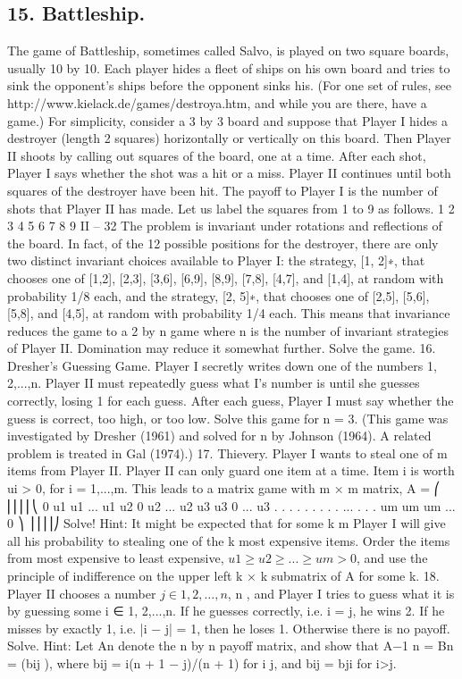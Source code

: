 \subsection{15. Battleship.}
The game of Battleship, sometimes called Salvo, is played on two
square boards, usually 10 by 10. Each player hides a fleet of ships on his own board and
tries to sink the opponent’s ships before the opponent sinks his. (For one set of rules, see
http://www.kielack.de/games/destroya.htm, and while you are there, have a game.)
For simplicity, consider a 3 by 3 board and suppose that Player I hides a destroyer
(length 2 squares) horizontally or vertically on this board. Then Player II shoots by calling
out squares of the board, one at a time. After each shot, Player I says whether the shot
was a hit or a miss. Player II continues until both squares of the destroyer have been hit.
The payoff to Player I is the number of shots that Player II has made. Let us label the
squares from 1 to 9 as follows.
1 2 3
4 5 6
7 8 9
II – 32
The problem is invariant under rotations and reflections of the board. In fact, of
the 12 possible positions for the destroyer, there are only two distinct invariant choices
available to Player I: the strategy, [1, 2]∗, that chooses one of [1,2], [2,3], [3,6], [6,9], [8,9],
[7,8], [4,7], and [1,4], at random with probability 1/8 each, and the strategy, [2, 5]∗, that
chooses one of [2,5], [5,6], [5,8], and [4,5], at random with probability 1/4 each. This means
that invariance reduces the game to a 2 by n game where n is the number of invariant
strategies of Player II. Domination may reduce it somewhat further. Solve the game.
16. Dresher’s Guessing Game. Player I secretly writes down one of the numbers
1, 2,...,n. Player II must repeatedly guess what I’s number is until she guesses correctly,
losing 1 for each guess. After each guess, Player I must say whether the guess is correct,
too high, or too low. Solve this game for n = 3. (This game was investigated by Dresher
(1961) and solved for n  by Johnson (1964). A related problem is treated in Gal
(1974).)
17. Thievery. Player I wants to steal one of m  items from Player II. Player II
can only guard one item at a time. Item i is worth ui > 0, for i = 1,...,m. This leads to
a matrix game with m × m matrix,
A =
⎛
⎜⎜⎜⎜⎝
0 u1 u1 ... u1
u2 0 u2 ... u2
u3 u3 0 ... u3
.
.
. .
.
. .
.
. ... .
.
.
um um um ... 0
⎞
⎟⎟⎟⎟⎠
Solve!
Hint: It might be expected that for some k \leq m Player I will give all his probability
to stealing one of the k most expensive items. Order the items from most expensive to
least expensive, $u1 \geq u2 \geq ... \geq um > 0$, and use the principle of indifference on the upper
left k × k submatrix of A for some k.
18. Player II chooses a number $j \in {1, 2,\ldots,n}$, n , and Player I tries to guess
what it is by guessing some i ∈ {1, 2,...,n}. If he guesses correctly, i.e. i = j, he wins 2.
If he misses by exactly 1, i.e. |i − j| = 1, then he loses 1. Otherwise there is no payoff.
Solve. Hint: Let An denote the n by n payoff matrix, and show that A−1 n = Bn = (bij ),
where bij = i(n + 1 − j)/(n + 1) for i \leq j, and bij = bji for i>j.
